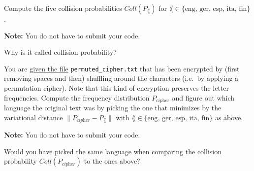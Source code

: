 \documentclass[a4paper,10pt,landscape,twocolumn]{scrartcl}
\begin{document}
\begin{exercise}
\begin{subex}[(2pt)]
Compute the five collision probabilities $Coll(P_{\lang})$ for  $\lang \in \{ \textrm{eng, ger, esp, ita, fin} \}$. 

\textbf{Note:} You do not have to submit your code.
\end{subex}

\begin{subex}[(1pt)]
 Why is it called collision probability?
\end{subex}

\begin{subex}[(2pt)]
  You are \href{https://github.com/cschaffner/InformationTheory/blob/master/Problems/HW1/permuted_cipher.txt}{given the file} {\texttt{permuted\_cipher.txt}} that has been encrypted by (first removing spaces and then) shuffling around the
characters (i.e.\ by applying a permutation cipher). Note that this kind of 
encryption preserves the letter frequencies. Compute the frequency distribution
$P_{\textit{cipher}}$ and figure out which language the original text was by
picking the one that minimizes by the variational distance
$\| P_{\textit{cipher}} - P_{\lang}\|$ with $\lang \in \{
\textrm{eng, ger, esp, ita, fin} \}$ as above.

\textbf{Note:} You do not have to submit your code.
\end{subex}

\begin{subex}[(1pt)]
Would you have picked the same language when comparing the collision probability $Coll(P_{\textit{cipher}})$ to the ones above?
\end{subex}

\end{exercise}
\end{document}
